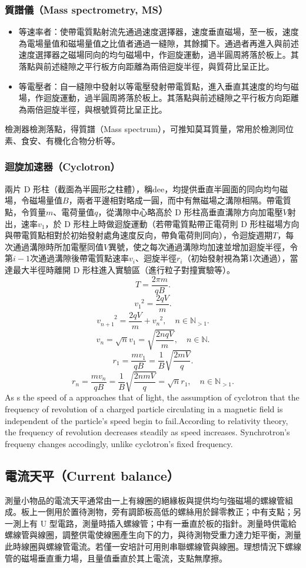 \documentclass[a4paper,12pt]{report}
\begin{document}
\begin{itemize}
\subsubsection{質譜儀（Mass spectrometry, MS）}
\begin{itemize}
\item 等速率者：使帶電質點射流先通過速度選擇器，速度垂直磁場，至一板，速度為電場量值和磁場量值之比值者通過一縫隙，其餘攔下。通過者再進入與前述速度選擇器之磁場同向的均勻磁場中，作迴旋運動，過半圓周將落於板上。其落點與前述縫隙之平行板方向距離為兩倍迴旋半徑，與質荷比呈正比。
\item 等電壓者：自一縫隙中發射以等電壓發射帶電質點，進入垂直其速度的均勻磁場，作迴旋運動，過半圓周將落於板上。其落點與前述縫隙之平行板方向距離為兩倍迴旋半徑，與根號質荷比呈正比。
\end{itemize}
檢測器檢測落點，得質譜（Mass spectrum），可推知莫耳質量，常用於檢測同位素、食安、有機化合物分析等。
\subsubsection{迴旋加速器（Cyclotron）}
兩片 D 形柱（截面為半圓形之柱體），稱dee，均提供垂直半圓面的同向均勻磁場，令磁場量值$B$，兩者平邊相對略成一圓，而中有無磁場之溝隙相隔。帶電質點，令質量$m$、電荷量值$q$，從溝隙中心略高於 D 形柱高垂直溝隙方向加電壓$V$射出，速率$v_1$，於 D 形柱上時做迴旋運動（若帶電質點帶正電荷則 D 形柱磁場方向與帶電質點相對於初始發射處角速度反向，帶負電荷則同向），令迴旋週期$T$，每次通過溝隙時所加電壓同值$V$異號，使之每次通過溝隙均加速並增加迴旋半徑，令第$i-1$次通過溝隙後帶電質點速率$v_i$、迴旋半徑$r_i$（初始發射視為第1次通過），當達最大半徑時離開 D 形柱進入實驗區（進行粒子對撞實驗等）。
\[T=\frac{2\pi m}{qB}.\]
\[v_1^{\phantom{1}2}=\frac{2qV}{m}.\]
\[v_{n+1}^{\phantom{n+1}2}=\frac{2qV}{m}+v_n^{\phantom{n}2},\quad n\in\mathbb{N}_{>1}.\]
\[v_n=\sqrt{n}v_1=\sqrt{\frac{2nqV}{m}},\quad n\in\mathbb{N}.\]
\[r_1=\frac{mv_1}{qB}=\frac{1}{B}\sqrt{\frac{2mV}{q}}.\]
\[r_n=\frac{mv_n}{qB}=\frac{1}{B}\sqrt{\frac{2nmV}{q}}=\sqrt{n}r_1,\quad n\in\mathbb{N}_{>1}.\]
As s the speed of a approaches that of light, the assumption of cyclotron that the frequency of revolution of a charged particle circulating in a magnetic field is independent of the particle's speed begin to fail.According to relativity theory, the frequency of revolution decreases steadily as speed increases. Synchrotron's frequeny changes accodingly, unlike cyclotron's fixed frequency.
\subsection{電流天平（Current balance）}
測量小物品的電流天平通常由一上有線圈的絕緣板與提供均勻強磁場的螺線管組成。板上一側用於置待測物，旁有調節板高低的螺絲用於歸零教正；中有支點；另一測上有 U 型電路，測量時插入螺線管；中有一垂直於板的指針。測量時供電給螺線管與線圈，調整供電使線圈產生向下的力，與待測物受重力達力矩平衡，測量此時線圈與螺線管電流。若僅一安培計可用則串聯螺線管與線圈。理想情況下螺線管的磁場垂直重力場，且量值垂直於其上電流，支點無摩擦。


\end{itemize}
\end{document}
